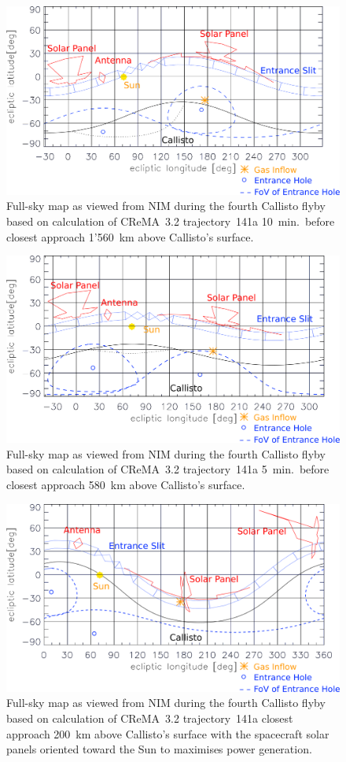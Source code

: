 	\begin{figure}[h!]
		\centering
		\includegraphics[width = .7\textwidth]{Bilder/NIM_pointing_2031JAN15194200.png}
		\caption{Full-sky map as viewed from NIM during the fourth Callisto flyby based on calculation of CReMA~3.2 trajectory~141a \cite{SOC_Crema3p2} 10~min.\ before closest approach 1'560~km above Callisto's surface.}
		\label{fig:FlybyCal1942}
	\end{figure}
	\begin{figure}[h!]
		\centering
		\includegraphics[width = .7\textwidth]{Bilder/NIM_pointing_2031JAN15194700.png}
		\caption{Full-sky map as viewed from NIM during the fourth Callisto flyby based on calculation of CReMA~3.2 trajectory~141a \cite{SOC_Crema3p2} 5~min.\ before closest approach 580~km above Callisto's surface.}
		\label{fig:FlybyCal1947}
	\end{figure}
	\begin{figure}[h!]
		\centering
		\includegraphics[width = .7\textwidth]{Bilder/NIM_pointing_2031JAN15195200_tilt.png}
		\caption{Full-sky map as viewed from NIM during the fourth Callisto flyby based on calculation of CReMA~3.2 trajectory~141a \cite{SOC_Crema3p2} closest approach 200~km above Callisto's surface with the spacecraft solar panels oriented toward the Sun to maximises power generation.}
		\label{fig:FlybyCal1952sol}
	\end{figure}
